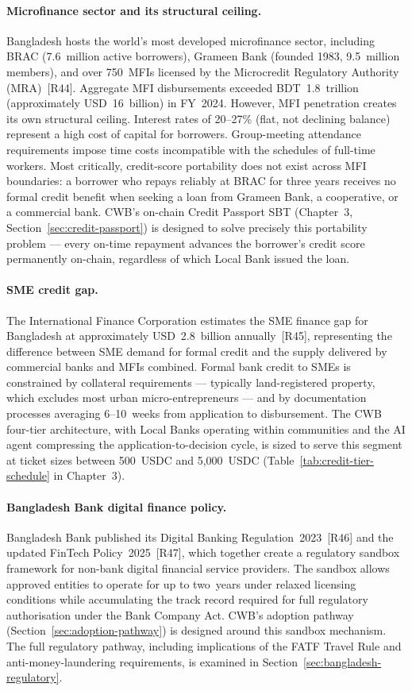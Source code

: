 \paragraph{Microfinance sector and its structural ceiling.}
Bangladesh hosts the world's most developed microfinance sector, including
BRAC (7.6~million active borrowers), Grameen Bank (founded 1983,
9.5~million members), and over 750~MFIs licensed by the Microcredit
Regulatory Authority (MRA)~[R44]. Aggregate MFI disbursements exceeded
BDT~1.8~trillion (approximately USD~16~billion) in FY~2024. However, MFI
penetration creates its own structural ceiling. Interest rates of 20--27\%
(flat, not declining balance) represent a high cost of capital for borrowers.
Group-meeting attendance requirements impose time costs incompatible with
the schedules of full-time workers. Most critically, credit-score portability
does not exist across MFI boundaries: a borrower who repays reliably at BRAC
for three years receives no formal credit benefit when seeking a loan from
Grameen Bank, a cooperative, or a commercial bank. CWB's on-chain Credit
Passport SBT (Chapter~3, Section~\ref{sec:credit-passport}) is designed to
solve precisely this portability problem --- every on-time repayment advances
the borrower's credit score permanently on-chain, regardless of which Local
Bank issued the loan.

\paragraph{SME credit gap.}
The International Finance Corporation estimates the SME finance gap for
Bangladesh at approximately USD~2.8~billion annually~[R45], representing
the difference between SME demand for formal credit and the supply delivered
by commercial banks and MFIs combined. Formal bank credit to SMEs is
constrained by collateral requirements --- typically land-registered property,
which excludes most urban micro-entrepreneurs --- and by documentation
processes averaging 6--10~weeks from application to disbursement. The CWB
four-tier architecture, with Local Banks operating within communities and the
AI agent compressing the application-to-decision cycle, is sized to serve
this segment at ticket sizes between 500~USDC and 5,000~USDC
(Table~\ref{tab:credit-tier-schedule} in Chapter~3).

\paragraph{Bangladesh Bank digital finance policy.}
Bangladesh Bank published its Digital Banking Regulation~2023~[R46] and the
updated FinTech Policy~2025~[R47], which together create a regulatory sandbox
framework for non-bank digital financial service providers. The sandbox allows
approved entities to operate for up to two~years under relaxed licensing
conditions while accumulating the track record required for full regulatory
authorisation under the Bank Company Act. CWB's adoption pathway
(Section~\ref{sec:adoption-pathway}) is designed around this sandbox
mechanism. The full regulatory pathway, including implications of the FATF
Travel Rule and anti-money-laundering requirements, is examined in
Section~\ref{sec:bangladesh-regulatory}.

